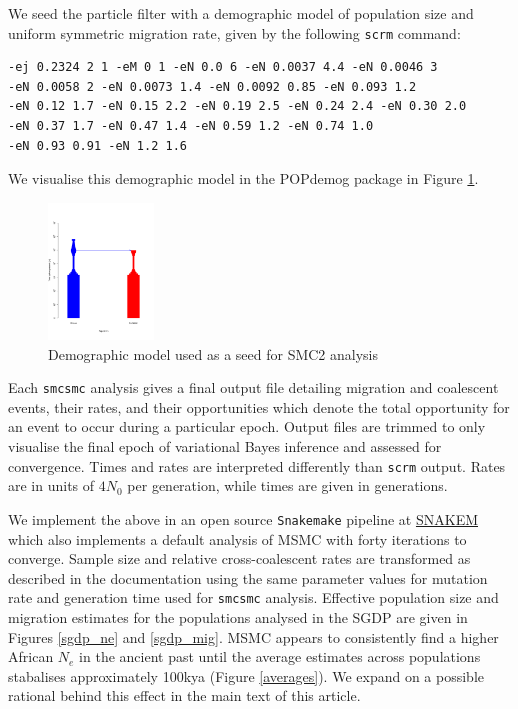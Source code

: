 \documentclass{article}
\begin{document}
We seed the particle filter with a demographic model of population size and uniform symmetric migration rate, given by the following {\tt scrm} command:

\begin{verbatim}
-ej 0.2324 2 1 -eM 0 1 -eN 0.0 6 -eN 0.0037 4.4 -eN 0.0046 3 
-eN 0.0058 2 -eN 0.0073 1.4 -eN 0.0092 0.85 -eN 0.093 1.2 
-eN 0.12 1.7 -eN 0.15 2.2 -eN 0.19 2.5 -eN 0.24 2.4 -eN 0.30 2.0 
-eN 0.37 1.7 -eN 0.47 1.4 -eN 0.59 1.2 -eN 0.74 1.0 
-eN 0.93 0.91 -eN 1.2 1.6
\end{verbatim}

We visualise this demographic model in the POPdemog package in Figure \ref{smc2demog}.

\begin{figure}
	\centering
	\includegraphics[width=0.25\textwidth]{../plot/dem_smc2.pdf}
	\caption{Demographic model used as a seed for SMC2 analysis}
	\label{smc2demog}
\end{figure}

Each {\tt smcsmc} analysis gives a final output file detailing migration and coalescent events, their rates, and their opportunities which denote the total opportunity for an event to occur during a particular epoch. Output files are trimmed to only visualise the final epoch of variational Bayes inference and assessed for convergence. Times and rates are interpreted differently than {\tt scrm} output. Rates are in units of $4N_0$ per generation, while times are given in generations. 

We implement the above in an open source {\tt Snakemake} pipeline at \url{SNAKEM} which also implements a default analysis of MSMC with forty iterations to converge. Sample size and relative cross-coalescent rates are transformed as described in the documentation using the same parameter values for mutation rate and generation time used for {\tt smcsmc} analysis. Effective population size and migration estimates for the populations analysed in the SGDP are given in Figures \ref{sgdp_ne} and \ref{sgdp_mig}. MSMC appears to consistently find a higher African $N_e$ in the ancient past until the average estimates across populations stabalises approximately 100kya (Figure \ref{averages}). We expand on a possible rational behind this effect in the main text of this article.
\end{document}
